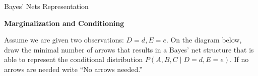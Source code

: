 \begin{problem}{Bayes' Nets Representation}
\begin{question}[]{\bf Marginalization and Conditioning}
\begin{subquestion}[6]
\begin{minipage}[c]{\linewidth}
    \centering
    \OneBii
    \vspace{.25in}
  \end{minipage}
\end{subquestion}

\begin{subquestion}[6]
Assume we are given two observations: $D=d, E=e$.
On the diagram below, draw the minimal number of arrows that results
in a Bayes' net structure that is able to represent the conditional distribution $P(A,B,C \mid D=d, E=e)$.
 If no arrows are needed write ``No arrows needed.''
\begin{minipage}[c]{\linewidth}
    \centering
    \OneBiii
    \vspace{.25in}
  \end{minipage}
\end{subquestion}

\end{question}

\end{problem}